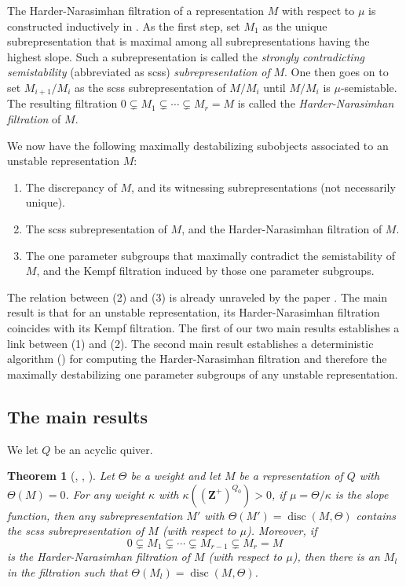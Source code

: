 \documentclass[a4paper]{amsart}
\numberwithin{equation}{section}
\theoremstyle{plain}
\newtheorem{thmx}{Theorem}
\theoremstyle{definition}
\DeclareMathOperator{\disc}{disc}
\begin{document}
The Harder-Narasimhan filtration of a representation $M$ with respect to $\mu$ is constructed inductively in \cite{MR1906875}. As the first step, set $M_1$ as the unique subrepresentation that is maximal among all subrepresentations having the highest slope. Such a subrepresentation is called the \emph{strongly contradicting semistability }(abbreviated as scss) \emph{subrepresentation of }$M$. One then goes on to set $M_{i+1}/M_{i}$ as the scss subrepresentation of $M/M_i$ until $M/M_i$ is $\mu$-semistable. The resulting filtration $0\subsetneq M_1\subsetneq \cdots\subsetneq M_r=M$ is called the \emph{Harder-Narasimhan filtration} of $M$.


We now have the following maximally destabilizing subobjects associated to an unstable representation $M$:
\begin{enumerate}
    \item The discrepancy of $M$, and its witnessing subrepresentations (not necessarily unique).
    \item The scss subrepresentation of $M$, and the Harder-Narasimhan filtration of $M$.
    \item The one parameter subgroups that maximally contradict the semistability of $M$, and the Kempf filtration induced by those one parameter subgroups. 
\end{enumerate}

The relation between (2) and (3) is already unraveled by the paper \cite{MR3199484}. The main result is that for an unstable representation, its Harder-Narasimhan filtration coincides with its Kempf filtration. The first of our two main results  establishes a link between (1) and (2). The second main result  establishes a deterministic algorithm () for computing the Harder-Narasimhan filtration and therefore the  maximally destabilizing one parameter subgroups of any unstable representation. 

\subsection{The main results}
We let $Q$ be an acyclic quiver. 
\begin{thmx}[, ,  ]\label{HN_contains_Witness_to_disc_intro}
Let $\Theta$ be a weight and let $M$ be a representation of $Q$ with $\Theta(M) = 0$. For any weight $\kappa$ with $\kappa((\mathbf{Z}^{+})^{Q_0})>0$, if $\mu=\Theta/\kappa$ is the slope function, then any subrepresentation $M'$ with $\Theta(M')=\disc(M,\Theta)$ contains the scss subrepresentation of $M$ (with respect to $\mu$). Moreover, if $$0\subsetneq M_{1}\subsetneq \cdots \subsetneq M_{r-1}\subsetneq M_{r}=M$$ is the Harder-Narasimhan filtration of $M$ (with respect to $\mu$), then there is an $M_{l}$ in the filtration such that $\Theta(M_l)=\disc(M,\Theta)$. 
\end{thmx}
\end{document}
